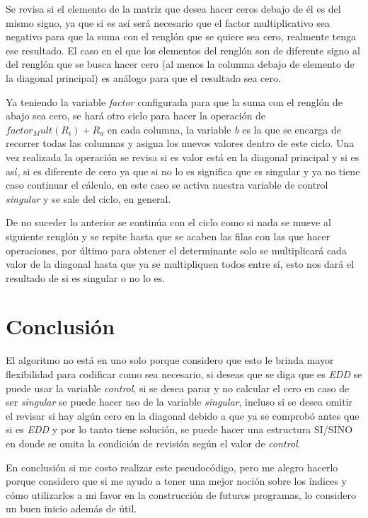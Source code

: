 \documentclass{article}
\begin{document}
Se revisa si el elemento de la matriz que desea hacer ceros debajo de él es del mismo signo, ya que si es
así será necesario que el factor multiplicativo sea negativo para que la suma con el renglón que se quiere sea
cero, realmente tenga ese resultado. El caso en el que los elementos del renglón son de diferente signo al
del renglón que se busca hacer cero (al menos la columna debajo de elemento de la diagonal principal) es
análogo para que el resultado sea cero.


Ya teniendo la variable \emph{factor} configurada para que la suma con el renglón de abajo sea cero, se hará
otro ciclo para hacer la operación de $factor_Mult(R_i) + R_a$ en cada columna, la variable \emph{b} es la que se
encarga de recorrer todas las columnas y asigna los nuevos valores dentro de este ciclo. Una vez realizada la operación
se revisa si es valor está en la diagonal principal y si es así, si es diferente de cero ya que si no lo es significa
que es singular y ya no tiene caso continuar el cálculo, en este caso se activa nuestra variable de control \emph{singular}
y se sale del ciclo, en general.


De no suceder lo anterior se continúa con el ciclo como si nada se mueve al siguiente renglón y se repite hasta que se acaben las
filas con las que hacer operaciones, por último para obtener el determinante solo se multiplicará cada valor de la diagonal hasta que
ya se multipliquen todos entre sí, esto nos dará el resultado de si es singular o no lo es.


\section{Conclusión}
El algoritmo no está en uno solo porque considero que esto le brinda mayor flexibilidad para codificar como sea necesario,
si deseas que se diga que es \emph{EDD} se puede usar la variable \emph{control}, si se desea parar y no calcular el cero en
caso de ser \emph{singular} se puede hacer uso de la variable \emph{singular}, incluso si se desea omitir el revisar si hay
algún cero en la diagonal debido a que ya se comprobó antes que si es \emph{EDD} y por lo tanto tiene solución, se puede hacer
una estructura SI/SINO en donde se omita la condición de revisión según el valor de \emph{control}.


En conclusión si me costo realizar este pseudocódigo, pero me alegro hacerlo porque considero que si me ayudo a tener una mejor
noción sobre los índices y cómo utilizarlos a mi favor en la construcción de futuros programas, lo considero un buen inicio además
de útil.
\end{document}
